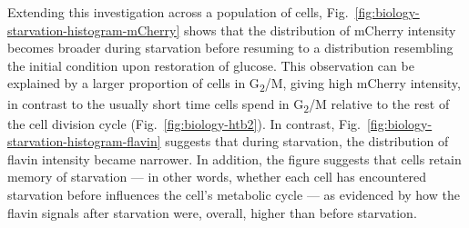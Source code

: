 Extending this investigation across a population of cells, Fig.\ \ref{fig:biology-starvation-histogram-mCherry} shows that the distribution of mCherry intensity becomes broader during starvation before resuming to a distribution resembling the initial condition upon restoration of glucose.
This observation can be explained by a larger proportion of cells in G\textsubscript{2}/M, giving high mCherry intensity, in contrast to the usually short time cells spend in G\textsubscript{2}/M relative to the rest of the cell division cycle (Fig.\ \ref{fig:biology-htb2}).
In contrast, Fig.\ \ref{fig:biology-starvation-histogram-flavin} suggests that during starvation, the distribution of flavin intensity became narrower.
In addition, the figure suggests that cells retain memory of starvation --- in other words, whether each cell has encountered starvation before influences the cell's metabolic cycle --- as evidenced by how the flavin signals after starvation were, overall, higher than before starvation.

